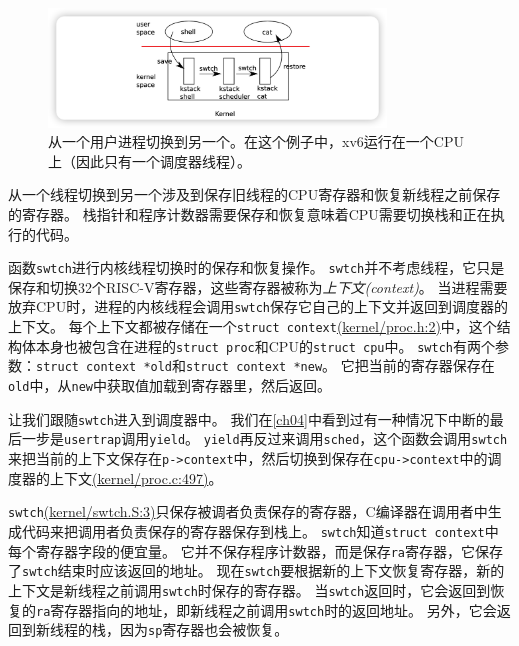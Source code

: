 \begin{figure}[htbp]
    \centering
    \includegraphics[width=0.8\textwidth]{../imgs/f7-1.png}
    \caption{从一个用户进程切换到另一个。在这个例子中，xv6运行在一个CPU上（因此只有一个调度器线程）。}
    \label{f7-1}
\end{figure}

从一个线程切换到另一个涉及到保存旧线程的CPU寄存器和恢复新线程之前保存的寄存器。
栈指针和程序计数器需要保存和恢复意味着CPU需要切换栈和正在执行的代码。

函数\texttt{swtch}进行内核线程切换时的保存和恢复操作。
\texttt{swtch}并不考虑线程，它只是保存和切换32个RISC-V寄存器，这些寄存器被称为\emph{上下文(context)}。
当进程需要放弃CPU时，进程的内核线程会调用\texttt{swtch}保存它自己的上下文并返回到调度器的上下文。
每个上下文都被存储在一个\texttt{struct context}\href{https://github.com/mit-pdos/xv6-riscv/blob/risc/kernel/proc.h#L2}{(kernel/proc.h:2)}中，这个结构体本身也被包含在进程的\texttt{struct proc}和CPU的\texttt{struct cpu}中。
\texttt{swtch}有两个参数：\texttt{struct context *old}和\texttt{struct context *new}。
它把当前的寄存器保存在\texttt{old}中，从\texttt{new}中获取值加载到寄存器里，然后返回。

让我们跟随\texttt{swtch}进入到调度器中。
我们在\autoref{ch04}中看到过有一种情况下中断的最后一步是\texttt{usertrap}调用\texttt{yield}。
\texttt{yield}再反过来调用\texttt{sched}，这个函数会调用\texttt{swtch}来把当前的上下文保存在\texttt{p->context}中，然后切换到保存在\texttt{cpu->context}中的调度器的上下文\href{https://github.com/mit-pdos/xv6-riscv/blob/risc/kernel/proc.c#L497}{(kernel/proc.c:497)}。

\texttt{swtch}\href{https://github.com/mit-pdos/xv6-riscv/blob/risc/kernel/swtch.S#L3}{(kernel/swtch.S:3)}只保存被调者负责保存的寄存器，C编译器在调用者中生成代码来把调用者负责保存的寄存器保存到栈上。
\texttt{swtch}知道\texttt{struct context}中每个寄存器字段的便宜量。
它并不保存程序计数器，而是保存\texttt{ra}寄存器，它保存了\texttt{swtch}结束时应该返回的地址。
现在\texttt{swtch}要根据新的上下文恢复寄存器，新的上下文是新线程之前调用\texttt{swtch}时保存的寄存器。
当\texttt{swtch}返回时，它会返回到恢复的\texttt{ra}寄存器指向的地址，即新线程之前调用\texttt{swtch}时的返回地址。
另外，它会返回到新线程的栈，因为\texttt{sp}寄存器也会被恢复。

